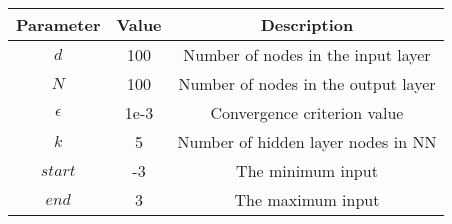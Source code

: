 \documentclass{article}
\begin{document}
  \begin{tabular}{|c | c | c |}
    \hline
    Parameter & Value & Description\\
    \hline
    $d$             & 100   & Number of nodes in the input layer\\
    $N$             & 100   & Number of nodes in the output layer\\
    $\epsilon$      & 1e-3  & Convergence criterion value \\
    $k$             & 5     & Number of hidden layer nodes in NN\\
    $start$         & -3    & The minimum input\\
    $end $          & 3     & The maximum input\\
    \hline
  \end{tabular}
\end{document}
